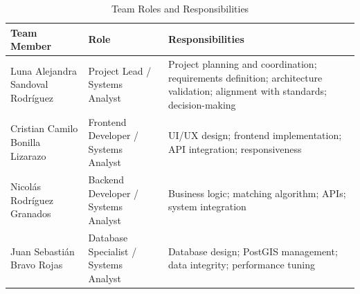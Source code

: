 \documentclass{article}
\begin{document}
\begin{table}[H]
\centering
\begin{tabular}{p{4cm} p{5cm} p{6cm}}
\toprule
\textbf{Team Member} & \textbf{Role} & \textbf{Responsibilities} \\
\midrule

Luna Alejandra Sandoval Rodríguez & Project Lead / Systems Analyst &
Project planning and coordination; requirements definition; architecture validation; alignment with standards; decision-making \\

Cristian Camilo Bonilla Lizarazo & Frontend Developer / Systems Analyst &
UI/UX design; frontend implementation; API integration; responsiveness \\

Nicolás Rodríguez Granados & Backend Developer / Systems Analyst &
Business logic; matching algorithm; APIs; system integration \\

Juan Sebastián Bravo Rojas & Database Specialist / Systems Analyst &
Database design; PostGIS management; data integrity; performance tuning \\

\bottomrule
\end{tabular}
\caption{Team Roles and Responsibilities}
\end{table}
\end{document}

